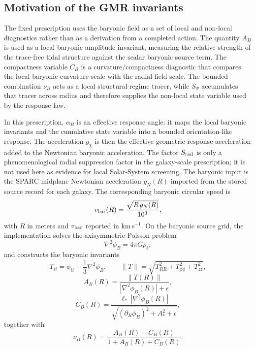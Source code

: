 ﻿\documentclass[twocolumn]{aastex701}
\begin{document}
\subsection{Motivation of the GMR invariants}

The fixed prescription uses the baryonic field as a set of local and non-local diagnostics rather than as a derivation from a completed action. The quantity $A_B$ is used as a local baryonic amplitude invariant, measuring the relative strength of the trace-free tidal structure against the scalar baryonic source term. The compactness variable $C_B$ is a curvature/compactness diagnostic that compares the local baryonic curvature scale with the radial-field scale. The bounded combination $\nu_B$ acts as a local structural-regime tracer, while $S_\Psi$ accumulates that tracer across radius and therefore supplies the non-local state variable used by the response law.

In this prescription, $\alpha_B$ is an effective response angle: it maps the local baryonic invariants and the cumulative state variable into a bounded orientation-like response. The acceleration $g_\chi$ is then the effective geometric-response acceleration added to the Newtonian baryonic acceleration. The factor $S_{\rm rad}$ is only a phenomenological radial suppression factor in the galaxy-scale prescription; it is not used here as evidence for local Solar-System screening. The baryonic input is the SPARC midplane Newtonian acceleration $g_N(R)$ imported from the stored source record for each galaxy. The corresponding baryonic circular speed is
\begin{equation}
v_{\rm bar}(R) = \frac{\sqrt{R\,g_N(R)}}{10^3},
\end{equation}
with $R$ in meters and $v_{\rm bar}$ reported in km\,s$^{-1}$. On the baryonic source grid, the implementation solves the axisymmetric Poisson problem
\begin{equation}
\nabla^2 \phi_B = 4\pi G\rho_b,
\end{equation}
and constructs the baryonic invariants
\begin{equation}
T_{ii} = \phi_{ii} - \frac{1}{3}\nabla^2\phi_B,
\qquad
\|T\| = \sqrt{T_{RR}^2 + T_{\phi\phi}^2 + T_{zz}^2},
\end{equation}
\begin{equation}
A_B(R) = \frac{\|T(R)\|}{|\nabla^2\phi_B(R)| + \epsilon},
\end{equation}
\begin{equation}
C_B(R) = \frac{\ell_*\,|\nabla^2\phi_B(R)|}{\sqrt{(\partial_R \phi_B)^2 + A_*^2 + \epsilon}},
\end{equation}
together with
\begin{equation}
\nu_B(R) = \frac{A_B(R) + C_B(R)}{1 + A_B(R) + C_B(R)}.
\end{equation}
\end{document}
